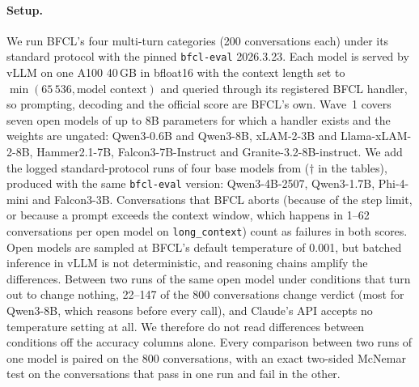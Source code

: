 \documentclass{article}
\newcommand{\cls}[1]{\texttt{#1}}
\begin{document}
\paragraph{Setup.} We run BFCL's four multi-turn categories (200 conversations each) under its standard protocol with
the pinned \cls{bfcl-eval} 2026.3.23. Each model is served by vLLM on one A100 40\,GB in bfloat16 with the context length
set to $\min(65\,536, \text{model context})$ and queried through its registered BFCL handler, so prompting, decoding and
the official score are BFCL's own. Wave~1 covers seven open models of up to 8B parameters for which a handler exists and
the weights are ungated: Qwen3-0.6B and Qwen3-8B, xLAM-2-3B and Llama-xLAM-2-8B, Hammer2.1-7B, Falcon3-7B-Instruct and
Granite-3.2-8B-instruct. We add the logged standard-protocol runs of four base models from
\citet{kovalenko2026effectworld} ($\dagger$ in the tables), produced with the same \cls{bfcl-eval} version: Qwen3-4B-2507,
Qwen3-1.7B, Phi-4-mini and Falcon3-3B. Conversations that BFCL aborts (because of the step limit, or because a prompt
exceeds the context window, which happens in 1--62 conversations per open model on \cls{long\_context}) count as
failures in both scores. Open models are sampled at BFCL's default temperature of 0.001, but batched inference in vLLM is
not deterministic, and reasoning chains amplify the differences. Between two runs of the same open model under
conditions that turn out to change nothing, 22--147 of the 800 conversations change verdict (most for Qwen3-8B, which
reasons before every call), and Claude's API accepts no temperature setting at all. We therefore do not read differences
between conditions off the accuracy columns alone. Every comparison between two runs of one model is paired on the 800
conversations, with an exact two-sided McNemar test on the conversations that pass in one run and fail in the other.
\end{document}
